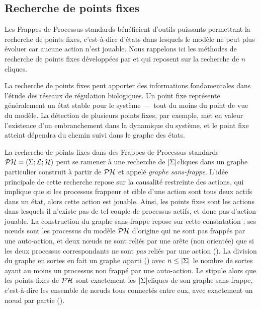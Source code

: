 \subsection{Recherche de points fixes}

Les Frappes de Processus standards bénéficient d'outils puissants permettant la recherche
de points fixes, c'est-à-dire d'états dans lesquels le modèle ne peut plus évoluer
car aucune action n'est jouable.
Nous rappelons ici les méthodes de recherche de points fixes développées par
 et qui reposent sur la recherche de $n$\nbd cliques.

\myskip

La recherche de points fixes peut apporter des informations fondamentales
dans l'étude des réseaux de régulation biologiques.
Un point fixe représente généralement un état stable pour le système
---~tout du moins du point de vue du modèle.
La détection de plusieurs points fixes, par exemple,
met en valeur l'existence d'un embranchement dans la dynamique du système,
et le point fixe atteint dépendra du chemin suivi dans le graphe des états.

La recherche de points fixes dans des Frappes de Processus standards $\mathcal{PH} = (\Sigma; \mathcal{L}; \mathcal{H})$
peut se ramener à une recherche de $|\Sigma|$\nbd cliques
dans un graphe particulier construit à partir de $\mathcal{PH}$ et appelé \emph{graphe sans-frappe}.
L'idée principale de cette recherche repose sur la causalité restreinte des actions,
qui implique que si les processus frappeur et cible d'une action sont tous deux actifs
dans un état, alors cette action est jouable.
Ainsi, les points fixes sont les actions dans lesquels il n'existe pas de tel couple de processus
actifs, et donc pas d'action jouable.
La construction du graphe sans-frappe repose sur cette constatation :
ses nœuds sont les processus du modèle $\mathcal{PH}$ d'origine
qui ne sont pas frappés par une auto-action,
et deux nœuds ne sont reliés par une arête (non orientée) que si les deux processus
correspondants ne sont \emph{pas} reliés par une action ().
La division du graphe en sortes en fait un graphe $n$\nbd parti ()
avec $n \leq |\Sigma|$ le nombre de sortes ayant au moins un processus
non frappé par une auto-action.
Le  stipule alors que les points fixes de $\mathcal{PH}$ sont exactement
les $|\Sigma|$\nbd cliques de son graphe sans-frappe,
c'est-à-dire les ensemble de nœuds tous connectés entre eux,
avec exactement un nœud par partie ().

